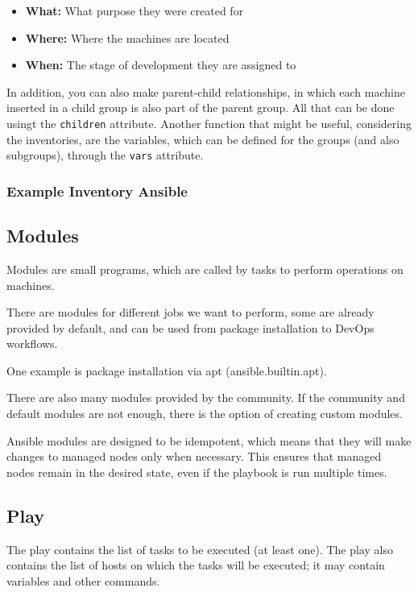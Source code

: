 \documentclass[12pt,a4paper,openright,twoside]{book}
\begin{document}
            \begin{itemize}
                \item \textbf{What:} What purpose they were created for
                \item \textbf{Where:} Where the machines are located
                \item \textbf{When:} The stage of development they are assigned to
            \end{itemize}
            
            In addition, you can also make parent-child relationships, in which each machine inserted in a child group is also part of the parent group. All that can be done usingt the \texttt{children} attribute.
            Another function that might be useful, considering the inventories, are the variables, which can be defined for the groups (and also subgroups), through the \texttt{vars} attribute.

\subsubsection{Example Inventory Ansible}



\subsection{Modules}
Modules are small programs, which are called by tasks to perform operations on machines.


There are modules for different jobs we want to perform, some are already provided by default, and can be used from package installation to DevOps workflows.


One example is package installation via apt (ansible.builtin.apt).


There are also many modules provided by the community. If the community and default modules are not enough, there is the option of creating custom modules\cite{ansibleDocNewModules}.


Ansible modules are designed to be idempotent, which means that they will make changes to managed nodes only when necessary. This ensures that managed nodes remain in the desired state, even if the playbook is run multiple times.

\subsection{Play}
The play contains the list of tasks to be executed (at least one). The play also contains the list of hosts on which the tasks will be executed; it may contain variables and other commands.
\end{document}
